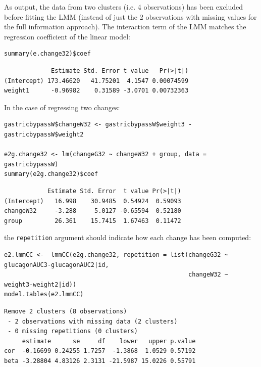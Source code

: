 \documentclass[12pt]{article}
\begin{document}
As output, the data from two clusters (i.e. 4 observations) has been
excluded before fitting the LMM (instead of just the 2 observations
with missing values for the full information approach). The
interaction term of the LMM matches the regression coefficient of the
linear model:
\lstset{language=r,label= ,caption= ,captionpos=b,numbers=none}
\begin{lstlisting}
summary(e.change32)$coef
\end{lstlisting}

\begin{verbatim}
             Estimate Std. Error t value   Pr(>|t|)
(Intercept) 173.46620   41.75201  4.1547 0.00074599
weight1      -0.96982    0.31589 -3.0701 0.00732363
\end{verbatim}


In the case of regressing two changes:
\lstset{language=r,label= ,caption= ,captionpos=b,numbers=none}
\begin{lstlisting}
gastricbypassW$changeW32 <- gastricbypassW$weight3 - gastricbypassW$weight2

e2g.change32 <- lm(changeG32 ~ changeW32 + group, data = gastricbypassW)
summary(e2g.change32)$coef
\end{lstlisting}

\begin{verbatim}
            Estimate Std. Error  t value Pr(>|t|)
(Intercept)   16.998    30.9485  0.54924  0.59093
changeW32     -3.288     5.0127 -0.65594  0.52180
group         26.361    15.7415  1.67463  0.11472
\end{verbatim}


the \texttt{repetition} argument should indicate how each change has
been computed:
\lstset{language=r,label= ,caption= ,captionpos=b,numbers=none}
\begin{lstlisting}
e2.lmmCC <-  lmmCC(e2g.change32, repetition = list(changeG32 ~ glucagonAUC3-glucagonAUC2|id,
                                                   changeW32 ~ weight3-weight2|id))
model.tables(e2.lmmCC)
\end{lstlisting}

\begin{verbatim}
Remove 2 clusters (8 observations) 
 - 2 observations with missing data (2 clusters) 
 - 0 missing repetitions (0 clusters)
     estimate      se     df    lower   upper p.value
cor  -0.16699 0.24255 1.7257  -1.3868  1.0529 0.57192
beta -3.28804 4.83126 2.3131 -21.5987 15.0226 0.55791
\end{verbatim}
\end{document}
